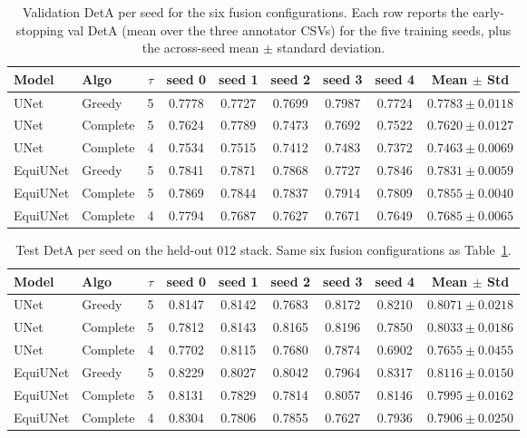 \begin{table}[ht]
\centering
\caption{Validation DetA per seed for the six fusion configurations. Each
row reports the early-stopping val DetA (mean over the three annotator
CSVs) for the five training seeds, plus the across-seed mean $\pm$
standard deviation.}
\label{tab:fusion-deta-val-perseed}
\begin{tabular}{l l c ccccc c}
\toprule
Model & Algo & $\tau$ & seed 0 & seed 1 & seed 2 & seed 3 & seed 4 & Mean $\pm$ Std \\
\midrule
UNet     & Greedy   & 5 & 0.7778 & 0.7727 & 0.7699 & 0.7987 & 0.7724 & $0.7783 \pm 0.0118$ \\
UNet     & Complete & 5 & 0.7624 & 0.7789 & 0.7473 & 0.7692 & 0.7522 & $0.7620 \pm 0.0127$ \\
UNet     & Complete & 4 & 0.7534 & 0.7515 & 0.7412 & 0.7483 & 0.7372 & $0.7463 \pm 0.0069$ \\
EquiUNet & Greedy   & 5 & 0.7841 & 0.7871 & 0.7868 & 0.7727 & 0.7846 & $0.7831 \pm 0.0059$ \\
EquiUNet & Complete & 5 & 0.7869 & 0.7844 & 0.7837 & 0.7914 & 0.7809 & $0.7855 \pm 0.0040$ \\
EquiUNet & Complete & 4 & 0.7794 & 0.7687 & 0.7627 & 0.7671 & 0.7649 & $0.7685 \pm 0.0065$ \\
\bottomrule
\end{tabular}
\end{table}

\begin{table}[ht]
\centering
\caption{Test DetA per seed on the held-out 012 stack. Same six fusion
configurations as Table~\ref{tab:fusion-deta-val-perseed}.}
\label{tab:fusion-deta-test-perseed}
\begin{tabular}{l l c ccccc c}
\toprule
Model & Algo & $\tau$ & seed 0 & seed 1 & seed 2 & seed 3 & seed 4 & Mean $\pm$ Std \\
\midrule
UNet     & Greedy   & 5 & 0.8147 & 0.8142 & 0.7683 & 0.8172 & 0.8210 & $0.8071 \pm 0.0218$ \\
UNet     & Complete & 5 & 0.7812 & 0.8143 & 0.8165 & 0.8196 & 0.7850 & $0.8033 \pm 0.0186$ \\
UNet     & Complete & 4 & 0.7702 & 0.8115 & 0.7680 & 0.7874 & 0.6902 & $0.7655 \pm 0.0455$ \\
EquiUNet & Greedy   & 5 & 0.8229 & 0.8027 & 0.8042 & 0.7964 & 0.8317 & $0.8116 \pm 0.0150$ \\
EquiUNet & Complete & 5 & 0.8131 & 0.7829 & 0.7814 & 0.8057 & 0.8146 & $0.7995 \pm 0.0162$ \\
EquiUNet & Complete & 4 & 0.8304 & 0.7806 & 0.7855 & 0.7627 & 0.7936 & $0.7906 \pm 0.0250$ \\
\bottomrule
\end{tabular}
\end{table}
